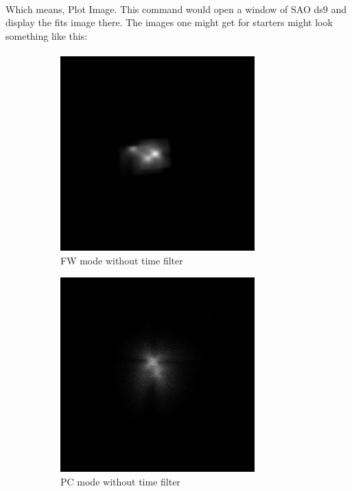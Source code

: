 \documentclass[a4paper,twoside]{report}
\numberwithin{equation}{section}
\begin{document}
\paragraph{}
Which means, Plot Image. This command would open a window of SAO ds$9$ and display the fits image there. The images one might get for starters might look something like this:
\paragraph{}
\begin{figure}[h]
\begin{subfigure}{0.5\textwidth}
\includegraphics[width=1.0\linewidth, height=7.5cm]{FWF1_nt.jpeg} 
\caption{FW mode without time filter}
\label{FW_1}
\end{subfigure}
\begin{subfigure}{0.5\textwidth}
\includegraphics[width=1.0\linewidth, height=7.5cm]{PC_nofilt.jpeg}
\caption{PC mode without time filter}
\label{PC_1}
\end{subfigure}
\caption{}
\label{FW_PC_NT}
\end{figure}
\end{document}
